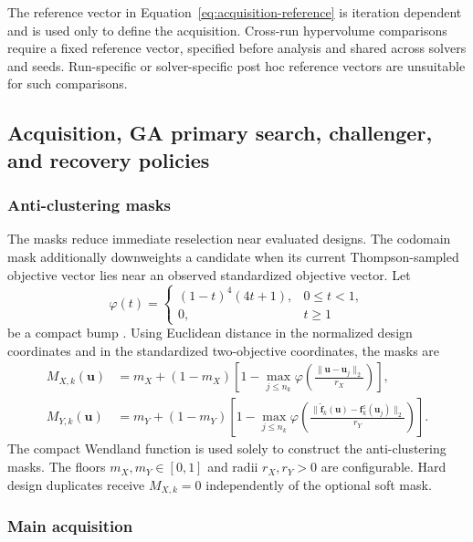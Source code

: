 \documentclass[twoside]{article}
\begin{document}
The reference vector in Equation~\eqref{eq:acquisition-reference} is
iteration dependent and is used only to define the acquisition. Cross-run
hypervolume comparisons require a fixed reference vector, specified before
analysis and shared across solvers and seeds. Run-specific or solver-specific
post hoc reference vectors are unsuitable for such comparisons.

\subsection{Acquisition, GA primary search, challenger, and recovery policies}

\subsubsection{Anti-clustering masks}

The masks reduce immediate reselection near evaluated designs. The codomain
mask additionally downweights a candidate when its current Thompson-sampled
objective vector lies near an observed standardized objective vector. Let
\begin{equation}
  \varphi(t)=
  \begin{cases}
    (1-t)^4(4t+1),&0\leq t<1,\\
    0,&t\geq1
  \end{cases}
  \label{eq:wendland-bump}
\end{equation}
be a compact bump \cite{wendland1995compact}. Using Euclidean distance in the
normalized design coordinates and in the standardized two-objective
coordinates, the masks are
\begin{align}
  M_{X,k}(\mathbf{u})
  &=
  m_X+(1-m_X)\!\left[
  1-\max_{j\leq n_k}
  \varphi\!\left(
  \frac{\|\mathbf{u}-\mathbf{u}_j\|_2}{r_X}
  \right)
  \right],
  \label{eq:design-mask}\\
  M_{Y,k}(\mathbf{u})
  &=
  m_Y+(1-m_Y)\!\left[
  1-\max_{j\leq n_k}
  \varphi\!\left(
  \frac{\|\widetilde{\mathbf f}_k(\mathbf{u})
  -\mathbf{f}_k^z(\mathbf{u}_j)\|_2}{r_Y}
  \right)
  \right].
  \label{eq:objective-mask}
\end{align}
The compact Wendland function is used solely to construct the anti-clustering
masks. The floors \(m_X,m_Y\in[0,1]\) and radii \(r_X,r_Y>0\) are configurable.
Hard design duplicates receive \(M_{X,k}=0\) independently of the optional
soft mask.

\subsubsection{Main acquisition}
\end{document}
